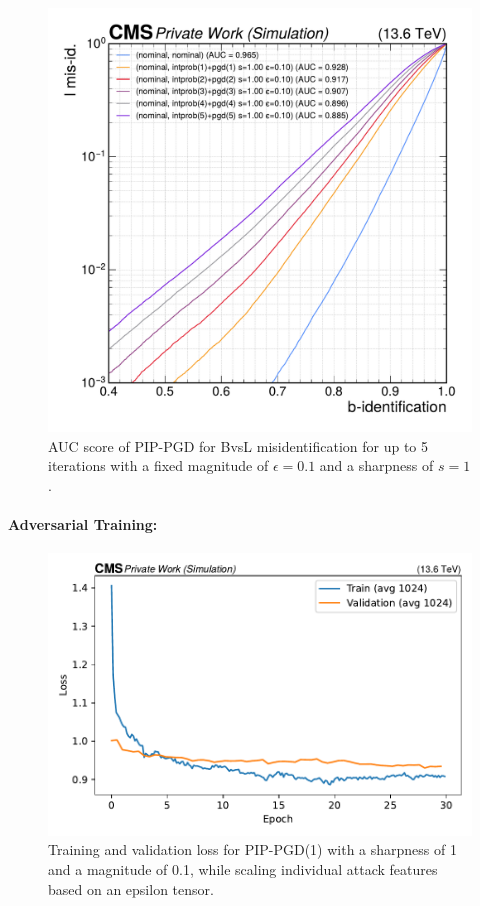 \begin{figure}[h]
\centering
    \includegraphics[width=12cm]{media/output/roc_bvsl_combined_iterations.pdf}
    \caption{AUC score of PIP-PGD for BvsL misidentification for up to 5 iterations with a fixed magnitude of $\epsilon=0.1$ and a sharpness of $s=1$.}
    \label{fig:combined_testing_iterations}
\end{figure}

\paragraph{Adversarial Training:}

\begin{figure}[h]
\centering
    \includegraphics[width=12cm]{media/output/Combined eps=0.1, it=1, s=1_loss_validation.pdf}
    \caption{Training and validation loss for PIP-PGD(1) with a sharpness of 1 and a magnitude of 0.1, while scaling individual attack features based on an epsilon tensor.}
    \label{fig:combined_training_loss}
\end{figure}

